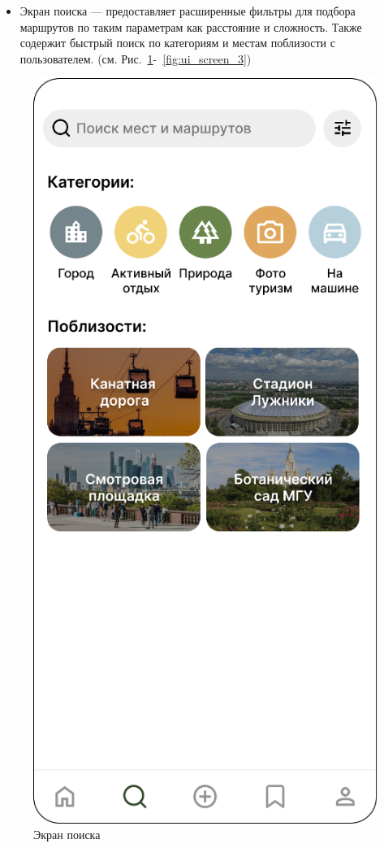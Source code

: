 \begin{itemize}
    \item Экран поиска — предоставляет расширенные фильтры для подбора маршрутов по таким параметрам как расстояние и сложность. Также содержит быстрый поиск по категориям и местам поблизости с пользователем. (см. Рис.~\ref{fig:ui_screen_2}-~\ref{fig:ui_screen_3})
\end{itemize}
\begin{figure}[H]
        \centering
        \includegraphics[width=0.4\linewidth]{Images/ui/Picture2.png}
        \caption{Экран поиска}
        \label{fig:ui_screen_2}
\end{figure}

